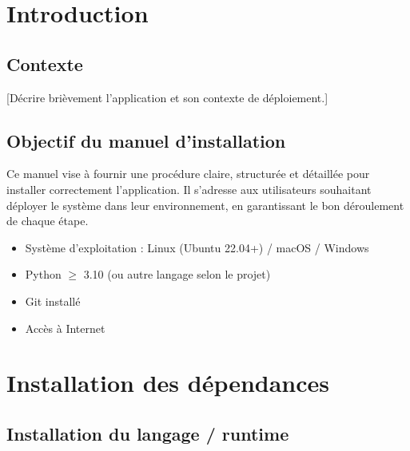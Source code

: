 \documentclass[12pt, a4paper]{article}
\begin{document}
\makecoverpage
\makesommaire

\section{Introduction}

\subsection{Contexte}

[Décrire brièvement l'application et son contexte de déploiement.]

\subsection{Objectif du manuel d'installation}

Ce manuel vise à fournir une procédure claire, structurée et détaillée pour
installer correctement l'application. Il s'adresse aux utilisateurs souhaitant
déployer le système dans leur environnement, en garantissant le bon déroulement
de chaque étape.

\begin{remarque}[Prérequis]
  \begin{itemize}
    \item Système d'exploitation : Linux (Ubuntu 22.04+) / macOS / Windows
    \item Python \(\geq\) 3.10 (ou autre langage selon le projet)
    \item Git installé
    \item Accès à Internet
  \end{itemize}
\end{remarque}

\section{Installation des dépendances}

\subsection{Installation du langage / runtime}
\end{document}
